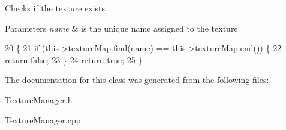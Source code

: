Checks if the texture exists. 


\begin{DoxyParams}{Parameters}
{\em name} & is the unique name assigned to the texture \\
\hline
\end{DoxyParams}

\begin{DoxyCode}
20                                                      \{
21     \textcolor{keywordflow}{if} (this->textureMap.find(name) == this->textureMap.end()) \{
22         \textcolor{keywordflow}{return} \textcolor{keyword}{false};
23     \}
24     \textcolor{keywordflow}{return} \textcolor{keyword}{true};
25 \}
\end{DoxyCode}


The documentation for this class was generated from the following files\-:\begin{DoxyCompactItemize}
\item 
\hyperlink{_texture_manager_8h}{Texture\-Manager.\-h}\item 
Texture\-Manager.\-cpp\end{DoxyCompactItemize}
